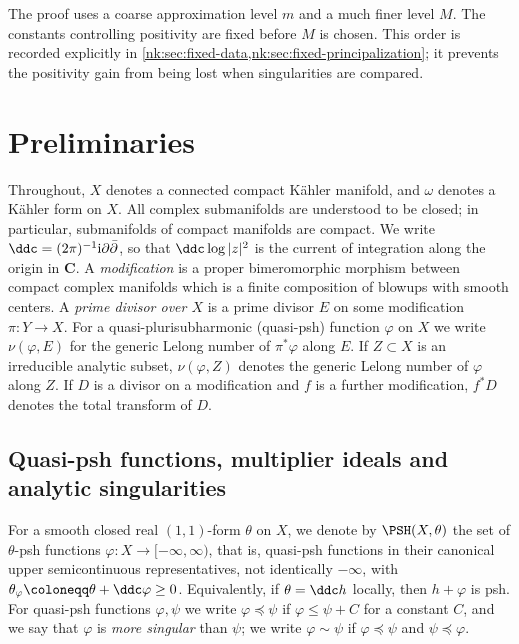 The proof uses a coarse approximation level $m$ and a much finer level
$M$. The constants controlling positivity are fixed before $M$ is
chosen. This order is recorded explicitly in
\cref{nk:sec:fixed-data,nk:sec:fixed-principalization}; it prevents the
positivity gain from being lost when singularities are compared.

\section{Preliminaries}\label{nk:sec:prelim}

Throughout, $X$ denotes a connected compact K\"ahler manifold, and $\omega$ denotes a K\"ahler form on $X$.
All complex submanifolds are understood to be closed; in particular,
submanifolds of compact manifolds are compact. We
write $\ddc=(2\pi)^{-1}\mathrm{i}\partial\bar\partial$, so that
$\ddc\log|z|^2$ is the current of integration along the origin in
$\mathbf C$. A \emph{modification} is a proper bimeromorphic morphism between
compact complex manifolds which is a finite composition of blowups with
smooth centers. A \emph{prime divisor over $X$} is a prime divisor
$E$ on some modification $\pi\colon Y\to X$. For a quasi-plurisubharmonic
(quasi-psh) function $\varphi$ on $X$ we write $\nu(\varphi,E)$ for the
generic Lelong number of $\pi^*\varphi$ along $E$. If
$Z\subset X$ is an irreducible analytic subset, $\nu(\varphi,Z)$ denotes
the generic Lelong number of $\varphi$ along $Z$. If $D$ is a divisor
on a modification and $f$ is a further modification, $f^*D$ denotes the
total transform of $D$.

\subsection{Quasi-psh functions, multiplier ideals and analytic
singularities}\label{nk:sec:qpsh}

For a smooth closed real $(1,1)$-form $\theta$ on $X$, we denote by
$\PSH(X,\theta)$ the set of $\theta$-psh functions
$\varphi\colon X\to[-\infty,\infty)$, that is, quasi-psh functions in
their canonical upper semicontinuous representatives, not identically
$-\infty$, with $\theta_\varphi\coloneqq \theta+\ddc\varphi\ge0$.
Equivalently, if $\theta=\ddc h$ locally, then $h+\varphi$ is psh.
For quasi-psh functions
$\varphi,\psi$ we write $\varphi\preceq\psi$ if
$\varphi\le\psi+C$ for a constant $C$, and we say that $\varphi$ is
\emph{more singular} than $\psi$; we write $\varphi\sim\psi$ if
$\varphi\preceq\psi$ and $\psi\preceq\varphi$.

